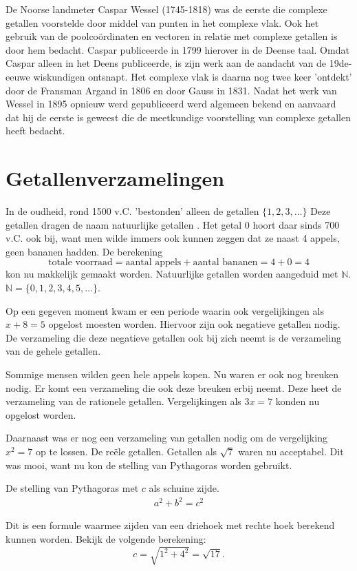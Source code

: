 \documentclass[11pt,fleqn]{book} %
\begin{document}
De Noorse landmeter Caspar Wessel (1745-1818) was de eerste die complexe getallen voorstelde door middel van punten in het complexe vlak. Ook het gebruik van de poolcoördinaten en vectoren in relatie met complexe getallen is door hem bedacht. Caspar publiceerde in 1799 hierover in de Deense taal. Omdat Caspar alleen in het Deens publiceerde, is zijn werk aan de aandacht van de 19de-eeuwe wiskundigen ontsnapt. Het complexe vlak is daarna nog twee keer 'ontdekt' door de Fransman Argand in 1806 en door Gauss in 1831. Nadat het werk van Wessel in 1895 opnieuw werd gepubliceerd werd algemeen bekend en aanvaard dat hij de eerste is geweest die de meetkundige voorstelling van complexe getallen heeft bedacht.

\section{Getallenverzamelingen}
In de oudheid, rond 1500 v.C. 'bestonden' alleen de getallen $\{1,2,3,\ldots\}$ Deze getallen dragen de naam natuurlijke getallen \cite{getal_en_ruimte}. Het getal 0 hoort daar sinds 700 v.C. ook bij, want men wilde immers ook kunnen zeggen dat ze naast 4 appels, geen bananen hadden. De berekening
\begin{displaymath}
\text{totale voorraad} = \text{aantal appels}+\text{aantal bananen}=4+0=4
\end{displaymath}
kon nu makkelijk gemaakt worden. Natuurlijke getallen worden aangeduid met $\mathbb{N}$. $\mathbb{N}=\{0,1,2,3,4,5,\ldots\}$.

Op een gegeven moment kwam er een periode waarin ook vergelijkingen als $x + 8 = 5$ opgelost moesten worden. Hiervoor zijn ook negatieve getallen nodig. De verzameling die deze negatieve getallen ook bij zich neemt is de verzameling van de gehele getallen.

Sommige mensen wilden geen hele appels kopen. Nu waren er ook nog breuken nodig. Er komt een verzameling die ook deze breuken erbij neemt. Deze heet de verzameling van de rationele getallen. Vergelijkingen als $3x = 7$ konden nu opgelost worden.

Daarnaast was er nog een verzameling van getallen nodig om de vergelijking $x^2 = 7$ op te lossen. De reële getallen. Getallen als $\sqrt{7}$ waren nu acceptabel. Dit was mooi, want nu kon de stelling van Pythagoras worden gebruikt.
\begin{theorem}\label{eq:pyth}
De stelling van Pythagoras met $c$ als schuine zijde.
\begin{align}
a^2+b^2=c^2
\end{align}
\end{theorem}
Dit is een formule waarmee zijden van een driehoek met rechte hoek berekend kunnen worden. Bekijk de volgende berekening:
\begin{displaymath}
c=\sqrt{1^2+4^2}=\sqrt{17}.
\end{displaymath}
\end{document}
